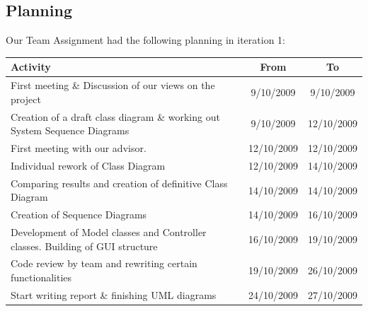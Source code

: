 		\subsection{Planning}
		Our Team Assignment had the following planning in iteration 1:\\
		\begin{tabular}{p{200 pt}|c|c}
		Activity & From & To\\
		\hline
		First meeting \& Discussion of our views on the project & 9/10/2009 & 9/10/2009\\ \hline
		Creation of a draft class diagram \& working out System Sequence Diagrams & 9/10/2009 & 12/10/2009\\ \hline
		First meeting with our advisor. & 12/10/2009 & 12/10/2009\\ \hline
		Individual rework of Class Diagram & 12/10/2009 & 14/10/2009\\ \hline
		Comparing results and creation of definitive Class Diagram & 14/10/2009 & 14/10/2009\\ \hline
		Creation of Sequence Diagrams & 14/10/2009 & 16/10/2009\\ \hline
		Development of Model classes and Controller classes. Building of GUI structure & 16/10/2009 & 19/10/2009\\ \hline
		Code review by team and rewriting certain functionalities & 19/10/2009 & 26/10/2009\\ \hline
		Start writing report \& finishing UML diagrams & 24/10/2009 & 27/10/2009\\ \hline
		\end{tabular}
